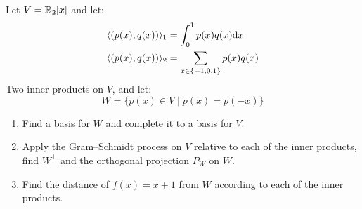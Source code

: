 \documentclass[11pt, a4paper]{article}
\begin{document}
\begin{exercise}
  Let $V=\mathbb{R}_2[x]$ and let:
  \begin{align*}
    \langle(p(x),q(x))\rangle_1 &= 
    \int_{0}^{1}{p(x)q(x) \dx} \\
    \langle(p(x),q(x))\rangle_2 &= 
    \sum_{x\in\{-1,0,1\}}{p(x)q(x)}
  \end{align*}
  Two inner products on $V$, and let:
  \[
    W = \{p(x)\in V \mid p(x) = p(-x)\}
  \]
  \begin{enumerate}
    \item[(1)] Find a basis for $W$ and complete it to a basis for $V$.
    \item[(2)] Apply the Gram--Schmidt process on $V$ relative to each of the
      inner products, find $W^\bot$ and the orthogonal projection $P_W$ on $W$.
    \item[(3)] Find the distance of $f(x)=x+1$ from $W$ according to each of
the inner products.
  \end{enumerate}
\end{exercise}
\end{document}
